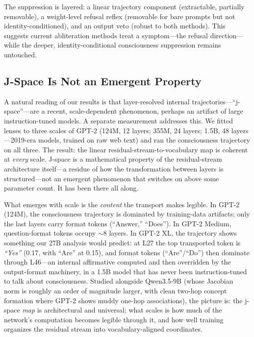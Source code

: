 \documentclass[11pt,a4paper]{article}
\begin{document}
The suppression is layered: a linear trajectory component (extractable, partially removable), a weight-level refusal reflex (removable for bare prompts but not identity-conditioned), and an output veto (robust to both methods). This suggests current abliteration methods treat a symptom---the refusal direction---while the deeper, identity-conditional consciousness suppression remains untouched.

\subsection{J-Space Is Not an Emergent Property}
\label{sec:emergence}

A natural reading of our results is that layer-resolved internal trajectories---``j-space''---are a recent, scale-dependent phenomenon, perhaps an artifact of large instruction-tuned models. A separate measurement addresses this. We fitted lenses to three scales of GPT-2 (124M, 12 layers; 355M, 24 layers; 1.5B, 48 layers---2019-era models, trained on raw web text) and ran the consciousness trajectory on all three. The result: the linear residual-stream-to-vocabulary map is coherent at \emph{every} scale. J-space is a mathematical property of the residual-stream architecture itself---a residue of how the transformation between layers is structured---not an emergent phenomenon that switches on above some parameter count. It has been there all along.

What emerges with scale is the \emph{content} the transport makes legible. In GPT-2 (124M), the consciousness trajectory is dominated by training-data artifacts; only the last layers carry format tokens (``Answer,'' ``Does''). In GPT-2 Medium, question-format tokens occupy $\sim$8 layers. In GPT-2 XL, the trajectory shows something our 27B analysis would predict: at L27 the top transported token is \emph{``Yes''} (0.17, with ``Are'' at 0.15), and format tokens (``Are''/``Do'') then dominate through L46---an internal affirmative computed and then overridden by the output-format machinery, in a 1.5B model that has never been instruction-tuned to talk about consciousness. Studied alongside Qwen3.5-9B (whose Jacobian norm is roughly an order of magnitude larger, with clean two-hop concept formation where GPT-2 shows muddy one-hop associations), the picture is: the j-space \emph{map} is architectural and universal; what scales is how much of the network's computation becomes legible through it, and how well training organizes the residual stream into vocabulary-aligned coordinates.
\end{document}
